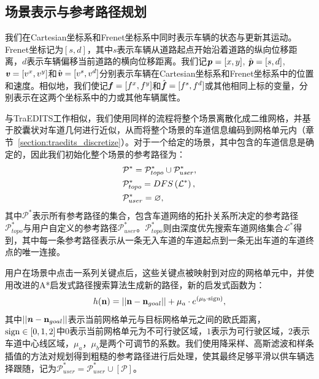 \subsection{场景表示与参考路径规划}
\label{section:keyframe_represent&plan}

我们在Cartesian坐标系和Frenet坐标系中同时表示车辆的状态与更新其运动。Frenet坐标记为$[s, d]$，其中$s$表示车辆从道路起点开始沿着道路的纵向位移距离，$d$表示车辆偏移当前道路的横向位移距离。我们记$\textbf{\emph{p}}=[x, y]$, $\hat{\textbf{\emph{p}}}=[s, d]$, $\textbf{\emph{v}}=[v^x, v^y]$和$\hat{\textbf{\emph{v}}}=[v^s, v^d]$分别表示车辆在Cartesian坐标系和Frenet坐标系中的位置和速度。相似地，我们使记$\textbf{\emph{f}}=[f^x, f^y]$和$\hat{\textbf{\emph{f}}}=[f^s, f^d]$或其他相同上标的变量，分别表示在这两个坐标系中的力或其他车辆属性。

与TraEDITS工作相似，我们使用同样的流程将整个场景离散化成二维网格，并基于胶囊状对车道几何进行近似，从而将整个场景的车道信息编码到网格单元内（章节~\ref{section:traedits_discretize}）。对于一个给定的场景，其中包含的车道信息是确定的，因此我们初始化整个场景的参考路径为：
\begin{equation}
\setlength\abovedisplayskip{6pt}
\setlength\belowdisplayskip{6pt}
\label{eq:keyframe_initpath}
\begin{aligned}
    &\mathcal{P}^* = {\mathcal{P}^*_{topo}}\cup{\mathcal{P}^*_{user}}, \\
    &\mathcal{P}^*_{topo} = DFS\left(\mathcal{L}^*\right), \\
    &\mathcal{P}^*_{user} = \varnothing,
\end{aligned}
\end{equation}
其中$\mathcal{P}^*$表示所有参考路径的集合，包含车道网络的拓扑关系所决定的参考路径$\mathcal{P}^*_{topo}$与用户自定义的参考路径$\mathcal{P}^*_{user}$。$\mathcal{P}^*_{topo}$则由深度优先搜索车道网络集合$\mathcal{L}^*$得到，其中每一条参考路径表示从一条无入车道的车道起点到一条无出车道的车道终点的唯一连接。

用户在场景中点击一系列关键点后，这些关键点被映射到对应的网格单元中，并使用改进的A*启发式路径搜索算法生成新的路径，新的启发式函数为：
\begin{equation}
\setlength\abovedisplayskip{6pt}
\setlength\belowdisplayskip{6pt}
\label{eq:keyframe_heuristic}
    h(\textbf{n}) = || \textbf{n} - \textbf{n}_{goal} || + \mu_a  \cdot e^{\left( \mu_b \cdot \rm{sign} \right)},
\end{equation}
其中$|| \textbf{\emph{n}} - \textbf{n}_{goal} ||$表示当前网格单元与目标网格单元之间的欧氏距离，$\rm{sign}\in[0,1,2]$中$0$表示当前网格单元为不可行驶区域，$1$表示为可行驶区域，$2$表示车道中心线区域，$\mu_a$，$\mu_b$是两个可调节的系数。我们使用降采样、高斯滤波和样条插值的方法对规划得到粗糙的参考路径进行后处理，使其最终足够平滑以供车辆选择跟随，记为$\mathcal{P}^*_{user} = \mathcal{P}^*_{user} \cup [\mathcal{P}]$。


